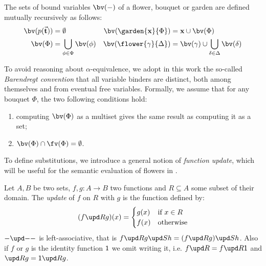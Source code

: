 \begin{scope}
\begin{definition}[Bound variables]
  The sets of bound variables $\bv(-)$ of a flower, bouquet or garden are
  defined mutually recursively as follows:
  \begin{align*}
    \bv(p(\tvec{t})) &= \emptyset &
    \bv(\garden{\bx}{\Phi}) &= \bx \cup \bv(\Phi) \\
    \bv(\Phi) &= \bigcup_{\phi \in \Phi}{\bv(\phi)} &
    \bv(\flower{\gamma}{\Delta}) &= \bv(\gamma) \cup \bigcup_{\delta \in \Delta}{\bv(\delta)}
  \end{align*}
\end{definition}

To avoid reasoning about $\alpha$-equivalence, we adopt in this work the
so-called \emph{Barendregt convention} that all variable binders are distinct,
both among themselves and from eventual free variables. Formally, we assume that
for any bouquet $\Phi$, the two following conditions hold:
\begin{enumerate}
  \item computing $\bv(\Phi)$ as a multiset gives the same result as computing
  it as a set;
  \item $\bv(\Phi) \cap \fv(\Phi) = \emptyset$.
\end{enumerate} 

To define substitutions, we introduce a general notion of \emph{function
update}, which will be useful for the semantic evaluation of flowers in
.

\begin{definition}
  Let $A, B$ be two sets, $f, g : A \to B$ two functions and $R \subseteq A$
  some subset of their domain. The \emph{update} of $f$ on $R$ with $g$ is the
  function defined by:
  $$
  (\update{f}{R}{g})(x) =
  \begin{cases}
    g(x) &\text{if $x \in R$} \\
    f(x) &\text{otherwise}
  \end{cases}
  $$
  $\update{-}{-}{-}$ is left-associative, that is
  $\update{f}{R}{\update{g}{S}{h}} = \update{(\update{f}{R}{g})}{S}{h}$. Also
  if $f$ or $g$ is the identity function $\mathsf{1}$ we omit writing it, i.e.
  $\update{f}{R}{{}} = \update{f}{R}{\idsubst}$ and $\update{{}}{R}{g} =
  \update{\idsubst}{R}{g}$.
\end{definition}


\end{scope}
